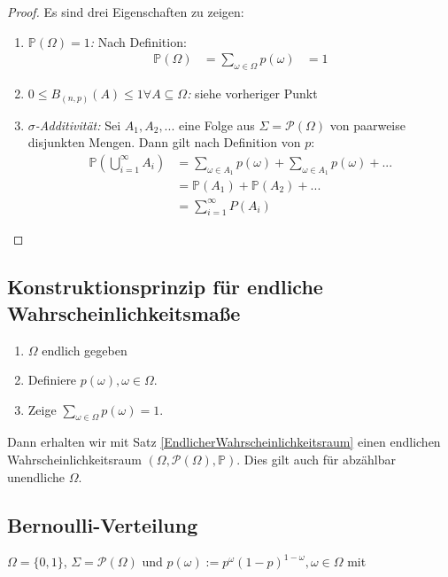 \begin{proof} Es sind drei Eigenschaften zu zeigen:
\newline
\begin{enumerate}
\item\emph{$\mathbb P(\Omega) = 1$:}
Nach Definition:
\begin{align*}
\mathbb P(\Omega) &= \sum\limits_{\omega \in \Omega}p(\omega) &= 1
\end{align*}
	\item\emph{$0 \leq B_{(n,p)}(A) \leq 1 \forall A \subseteq \Omega$:}
siehe vorheriger Punkt
	\item\emph{$\sigma$-Additivität:}
Sei $A_1,A_2, ... $ eine Folge aus $\Sigma = \mathcal P(\Omega)$ von paarweise disjunkten Mengen. Dann gilt nach Definition %
von $p$:
\begin{align*}
\mathbb P\left ( \bigcup\limits_{i=1}^\infty A_i \right ) &= \sum\limits_{\omega \in A_1}p(\omega) + \sum\limits_{\omega \in A_1}p(\omega) + ... \\
	&= \mathbb P(A_1) + \mathbb P(A_2) + ... \\
	&= \sum\limits_{i=1}^\infty P(A_i)
\end{align*}
\end{enumerate}
\end{proof}

\subsection{Konstruktionsprinzip für endliche Wahrscheinlichkeitsmaße}
\begin{enumerate}
\item $\Omega$ endlich gegeben
\item Definiere $p(\omega), \omega \in \Omega$.
\item Zeige $\sum\limits_{\omega \in \Omega} p(\omega) = 1$.
\end{enumerate}
Dann erhalten wir mit Satz \ref{EndlicherWahrscheinlichkeitsraum} einen endlichen Wahrscheinlichkeitsraum $(\Omega,\mathcal P(\Omega),\mathbb P)$.
Dies gilt auch für abzählbar unendliche $\Omega$.

\subsection{Bernoulli-Verteilung}
$\Omega = \{0,1\}$, $\Sigma = \mathcal P(\Omega)$ und $p(\omega):=p^{\omega} (1-p)^{1-\omega}, \omega \in \Omega$ mit 
